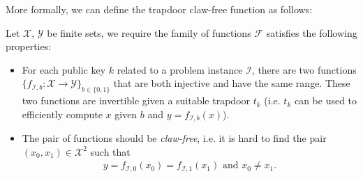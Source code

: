 \documentclass[cryptography,review,submit,pdftex,moreauthors,amsmath,amssymb,aps,strict]{Definitions/mdpi}
\begin{document}
More formally, we can define the trapdoor claw-free function as follows:
\begin{Definition}
    Let $\mathcal{X}$, $\mathcal{Y}$ be finite sets, we require the family of functions $\mathcal{F}$ satisfies the following properties:
\begin{itemize}
    \item For each public key $k$ related to a problem instance $\mathcal{I}$, there are two functions $\{f_{\mathcal{I},b}:\mathcal{X}\to\mathcal{Y}\}_{b\in\{0,1\}}$ that are both injective and have the same range. These two functions are invertible given a suitable trapdoor $t_k$ (i.e.  $t_k$ can be used to efficiently compute $x$ given $b$ and $y=f_{\mathcal{I},b}(x)$). 
    \item The pair of functions should be \textit{claw-free}, i.e. it is hard to find the pair $(x_0,x_1)\in\mathcal{X}^2$ such that 
    \begin{align}
        y=f_{\mathcal{I},0}(x_0)=f_{\mathcal{I},1}(x_1) \text{ and } x_0\neq x_1.
        \label{eq:aclaw}
    \end{align}
\end{itemize}
\end{Definition}
\end{document}

